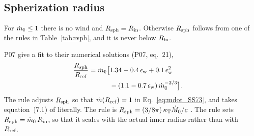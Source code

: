 

\subsection{Spherization radius}
\label{sec:radii:sph}

For $\dot m_0 \le 1$ there is no wind and $R_{\rm sph} = R_{\rm in}$.
Otherwise $R_{\rm sph}$ follows from one of the rules in Table~\ref{tab:rsph}, and it is never below $R_{\rm in}$.





P07 give a fit to their numerical solutions (P07, eq.~21),
\begin{equation}
\begin{split}
\frac{R_{\rm sph}}{R_{\rm ref}} = \dot m_0 \bigl[ & 1.34 - 0.4\,\epsilon_{\rm w} + 0.1\,\epsilon_{\rm w}^2 \\
& - (1.1 - 0.7\,\epsilon_{\rm w})\,\dot m_0^{-2/3} \bigr].
\end{split}
\label{eq:rsph_P07}
\end{equation}
The rule  adjusts $R_{\rm sph}$ so that $\dot m(R_{\rm ref}) = 1$ in Eq.~\eqref{eq:mdot_SS73}, and  takes equation~(7.1) of \citet{Shakura1973} literally.
The rule  is $R_{\rm sph} = (3/8\pi)\,\kappa_{\rm T}\dot M_0/c$ \citep{Middleton2026}.
The rule  sets $R_{\rm sph} = \dot m_0\,R_{\rm in}$, so that it scales with the actual inner radius rather than with $R_{\rm ref}$.

